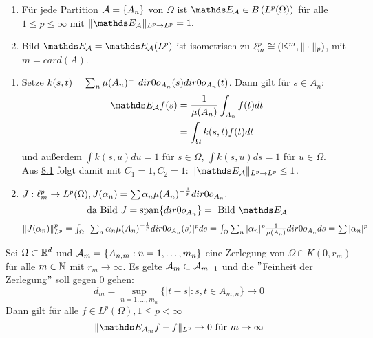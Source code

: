 \begin{kor}
	\begin{enumerate}[label=\alph*\upshape)]
		\item Für jede Partition $\mathcal{A} = \{ A_{n} \}$ von $\Omega$ ist $\EW_{\ca} \in B \left( L^{p}(\Omega) \right)$ für alle $1 \leq p \leq \infty$ mit $\| \EW_{\ca} \|_{L^{p} \rightarrow L^{p}} = 1.$
		\item Bild $\EW_{\ca} = \EW_{\ca}(L^{p})$ ist isometrisch zu $\ell^{p}_{m} \cong \left( \mathbb{K}^{m}, \| \cdot \|_{p} \right)$, mit $m = card(A)$.  
	\end{enumerate}
	\begin{beweis}	
		\begin{enumerate}[label=\alph*\upshape)]	
			\item Setze $k(s, t) = \sum_{n} \mu(A_{n})^{-1} \1_{A_{n}}(s) \1_{A_{n}}(t)$. Dann gilt für $s \in A_{n}$:
				\begin{align*}
					 \EW_{\ca} f(s) & = \frac{1}{\mu(A_{n})} \int_{A_{n}} f(t) dt \\
					 & = \int_{\Omega} k(s, t) f(t) dt
				\end{align*}
				und au{\ss}erdem $\int k(s, u) du = 1$ für $s \in \Omega$, $\int k(s, u) ds = 1$ für $u \in \Omega$. \\
				Aus \hyperref[satz:8.1]{8.1} folgt damit mit $C_{1} = 1, C_{2} = 1$: $\| \EW_{\ca} \|_{L^{p} \rightarrow L^{p}} \leq 1$.
			\item $J: \ell_{m}^{p} \rightarrow L^{p}(\Omega), J(\alpha_{n}) = \sum \alpha_{n} \mu(A_{n})^{- \frac{1}{p}} \1_{A_{n}}.$ \\
				\[ \text{da Bild } J = \text{span} \{ \1_{A_{n}} \} = \text{ Bild } \EW_{\ca} \]
				$\| J ( \alpha_{n}) \|_{L^{p}}^{p} = \int_{\Omega} | \sum_{n} \alpha_{n} \mu(A_{n})^{- \frac{1}{p}} \1_{A_{n}}(s) |^{p} ds = \int_{\Omega} \sum_{n} | \alpha_{n} |^{p} \frac{1}{\mu(A_{n})} \1_{A_{n}} ds = \sum |\alpha_{n}|^{p}$
		\end{enumerate}
	\end{beweis}
\end{kor}


\begin{satz} 
	Sei $\Omega \subset \mathbb{R}^{d}$ und $\mathcal{A}_{m} = \{ A_{n, m} : n = 1, \dotsc, m_{n} \}$ eine Zerlegung von $ \Omega \cap K(0, r_{m})$ für alle $m \in \mathbb{N}$ mit $r_{m} \rightarrow \infty$.
	Es gelte $\mathcal{A}_{m} \subset \mathcal{A}_{m + 1}$ und die $"$Feinheit der Zerlegung$"$ soll gegen $0$ gehen:
	\[ d_{m} = \sup_{n = 1, \dotsc, m_{n}} \{ |t - s| : s, t \in A_{m, n}  \} \rightarrow 0 \]
	Dann gilt für alle $f \in L^{p}(\Omega), 1 \leq p < \infty$
	\[ \| \EW_{\ca_{m}} f - f \|_{L^{p}} \rightarrow 0 \text{ für } m \rightarrow \infty \]
\end{satz}

